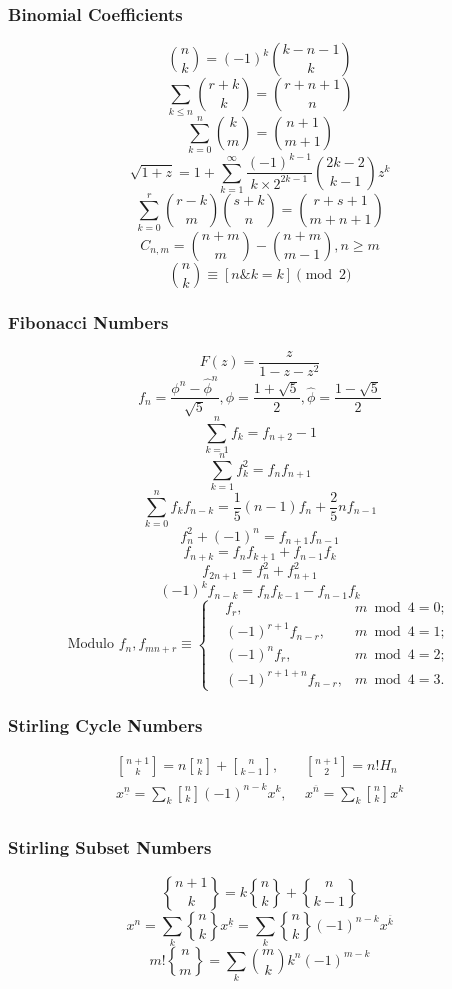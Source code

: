 \begin{small}
\subsubsection{Binomial Coefficients}
\[ {n \choose k} = (-1)^k{k-n-1 \choose k} \]
\[ \sum_{k \leq n}{r+k \choose k} = {r+n+1 \choose n} \]
\[ \sum_{k=0}^n{k \choose m} = {n+1 \choose m+1} \]
\[ \sqrt{1+z} = 1 + \sum_{k=1}^{\infty}\frac{(-1)^{k-1}}{k\times2^{2k-1}}{2k-2 \choose k-1}z^k \]
\[ \sum_{k=0}^{r}{r-k \choose m}{s+k \choose n} = {r+s+1 \choose m+n+1} \]
\[ C_{n, m} = {n+m \choose m} - {n+m \choose m-1}, n \geq m \]
\[ {n \choose k} \equiv [n\& k=k] \pmod 2 \]
\subsubsection{Fibonacci Numbers}
\[ F(z) = \frac{z}{1-z-z^2} \]
\[ f_n = \frac{{\phi}^n-{\hat{\phi}}^n}{\sqrt{5}}, \phi = \frac{1+\sqrt{5}}{2},
\hat{\phi} = \frac{1-\sqrt{5}}{2} \]
\[ \sum_{k=1}^nf_k = f_{n+2}-1 \]
\[ \sum_{k=1}^nf^2_k = f_nf_{n+1} \]
\[ \sum_{k=0}^nf_kf_{n-k} = \frac{1}{5}(n-1)f_n+\frac{2}{5}nf_{n-1} \]
\[ f^2_n + (-1)^n = f_{n+1}f_{n-1} \]
\[ f_{n+k} = f_nf_{k+1} + f_{n-1}f_k \]
\[ f_{2n+1} = f^2_n+f^2_{n+1} \]
\[ (-1)^kf_{n-k} = f_{n}f_{k-1} - f_{n-1}f_{k} \]
\[ \text{Modulo }f_n, f_{mn+r} \equiv \left\{
\begin{aligned}
&f_r,& m \bmod 4 = 0; \\
&(-1)^{r+1}f_{n-r},& m \bmod 4 = 1; \\
&(-1)^nf_r,& m \bmod 4 = 2; \\
&(-1)^{r+1+n}f_{n-r},& m \bmod 4 = 3.
\end{aligned}
\right.
\]
\subsubsection{Stirling Cycle Numbers}
\begin{align*}
 {n+1 \brack k} = n{n \brack k} + {n \brack k-1},&\ \  {n+1 \brack 2} = n!H_n \\
x^{\underline{n}} = \sum_k{ {n \brack k}(-1)^{n-k}x^k },&\ \  x^{\overline{n}} = \sum_k{ {n \brack k}x^k } \\
 \end{align*}
\subsubsection{Stirling Subset Numbers}
\[ {n+1 \brace k} = k{n \brace k} + {n \brace k-1} \]
\[ x^n = \sum_k{ {n \brace k}x^{\underline{k}} } = \sum_k{ {n \brace k}(-1)^{n-k}x^{\overline{k}} } \]
\[ m!{n \brace m} = \sum_k{m \choose k}k^n(-1)^{m-k} \]

\end{small}
